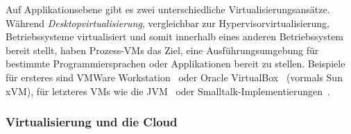 Auf Applikationsebene gibt es zwei unterschiedliche
Virtualisierungsansätze. Während \emph{Desktopvirtualisierung},
vergleichbar zur Hypervisorvirtualisierung, Betriebssysteme
virtualisiert und somit innerhalb eines anderen Betriebssystem bereit
stellt, haben Prozess-\acp{VM} das Ziel, eine Ausführungsumgebung für
bestimmte Programmiersprachen oder Applikationen bereit zu stellen.
Beispiele für ersteres sind VMWare
Workstation~\cite{VMWare-Inc:VMware-Workstat} oder Oracle
VirtualBox~\cite{Oracle-Corporation:VirtualBox} (vormals Sun xVM), für
letzteres \acp{VM} wie die
JVM~\cite{Sun-Developer-Network2003:The-Java-Virtua} oder
Smalltalk-Implementierungen~\cite{ansiSmalltalk}.

\subsubsection{Virtualisierung und die Cloud}


